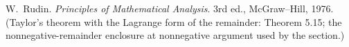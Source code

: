 
W.~Rudin.
\emph{Principles of Mathematical Analysis}.
3rd ed., McGraw--Hill, 1976. (Taylor's theorem with the Lagrange form
of the remainder: Theorem 5.15; the nonnegative-remainder enclosure at
nonnegative argument used by the  section.)
